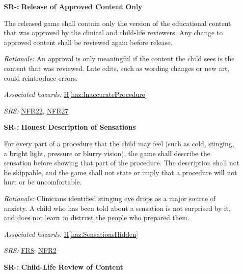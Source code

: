 \documentclass{article}
\newcounter{hazard}
\newcommand{\hazref}[1]{\hyperref[haz:#1]{H\ref*{haz:#1}}}
\newcounter{sr}
\newcommand{\srdef}[1]{\refstepcounter{sr}\label{sr:#1}\textbf{SR-\thesr:}}
\newcommand{\srsurl}{https://team-hindsight.github.io/ophthamology-game/SRS-IEEE/SRS.pdf}
\newcommand{\srsfrref}[2]{\href{\srsurl\#nameddest=#1}{FR#2}}
\newcommand{\srsnfrref}[2]{\href{\srsurl\#nameddest=#1}{NFR#2}}
\begin{document}
\begin{itemize}[leftmargin=1.5cm, labelwidth=1.3cm, labelsep=0.2cm,
  align=left, itemsep=1.2em, parsep=0.6em]
The game shall tell the child, in words and pictures suited to their age,
that their doctor may do things a little differently from the game.

\textit{Rationale:} Procedures vary between patients, clinicians and clinics
(Assumption~5). Telling the child this in advance means a difference at the
visit is less likely to surprise or upset them.

\textit{Associated hazards:} \hazref{InaccurateProcedure}

\textit{SRS:} \srsfrref{FR_ClinicsDiffer}{9}

\item[\srdef{ApprovedContent}] \textbf{Release of Approved Content Only}

The released game shall contain only the version of the educational content
that was approved by the clinical and child-life reviewers. Any change to
approved content shall be reviewed again before release.

\textit{Rationale:} An approval is only meaningful if the content the child
sees is the content that was reviewed. Late edits, such as wording changes or
new art, could reintroduce errors.

\textit{Associated hazards:} \hazref{InaccurateProcedure}

\textit{SRS:} \srsnfrref{NFR_ClinicalAccuracy}{22}, \srsnfrref{NFR_Integrity}{27}

\item[\srdef{HonestSensations}] \textbf{Honest Description of Sensations}

For every part of a procedure that the child may feel (such as cold, stinging,
a bright light, pressure or blurry vision), the game shall describe the
sensation before showing that part of the procedure. The description shall
not be skippable, and the game shall not state or imply that a procedure will
not hurt or be uncomfortable.

\textit{Rationale:} Clinicians identified stinging eye drops as a major source
of anxiety. A child who has been told about a sensation is not surprised by
it, and does not learn to distrust the people who prepared them.

\textit{Associated hazards:} \hazref{SensationsHidden}

\textit{SRS:} \srsfrref{FR_DescribeSensations}{8}; \srsnfrref{NFR_ChildSafe}{2}

\item[\srdef{ChildLifeReview}] \textbf{Child-Life Review of Content}


\end{itemize}
\end{document}
